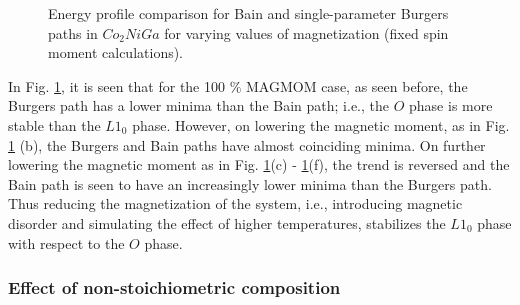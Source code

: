 \documentclass[%
preprint,
 amsmath,amssymb,
 aps,
prb,
showkeys,
]{revtex4-1}
\begin{document}
\begin{figure}[htp!]
\caption{Energy profile comparison for Bain and single-parameter Burgers paths in  $Co_2NiGa$  for varying values of magnetization (fixed spin moment calculations). }
\label{magnetic_disorder}
\end{figure}

In Fig. \ref{magnetic_disorder}, it is seen that for the 100 $\%$ MAGMOM case,  as seen before, the Burgers path has a lower minima than the Bain path; i.e., the $O$ phase is more stable than the $L1_0$ phase. However, on lowering the magnetic moment,  as in Fig. \ref{magnetic_disorder} (b), the Burgers and Bain paths have almost coinciding minima. On further lowering the magnetic moment  as in Fig. \ref{magnetic_disorder}(c) - \ref{magnetic_disorder}(f), the trend is reversed and the Bain path is seen to have an increasingly lower minima than the Burgers path.  Thus reducing the magnetization of the system, i.e., introducing magnetic disorder and simulating the effect of higher temperatures, stabilizes the $L1_0$ phase with respect to the $O$ phase. 
\subsubsection{Effect of non-stoichiometric composition}
\end{document}
